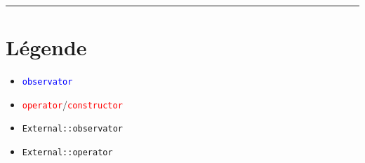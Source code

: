 \documentclass{article}
\newcommand{\cmd}[1]{\texttt{#1}}
\renewcommand{\o}[1]{\textcolor{blue}{#1}}
\renewcommand{\c}[1]{\textcolor{red}{#1}}
\newcommand{\eo}[1]{\textcolor{RoyalPurple}{#1}}
\newcommand{\ec}[1]{\textcolor{BrickRed}{#1}}
\begin{document}
\hrule

\section*{Légende}

\begin{itemize}
	\item \o{\cmd{observator}}
	\item \c{\cmd{operator}}/\c{\cmd{constructor}}
	\item \eo{\cmd{External::observator}}
	\item \ec{\cmd{External::operator}}
\end{itemize}
\end{document}
